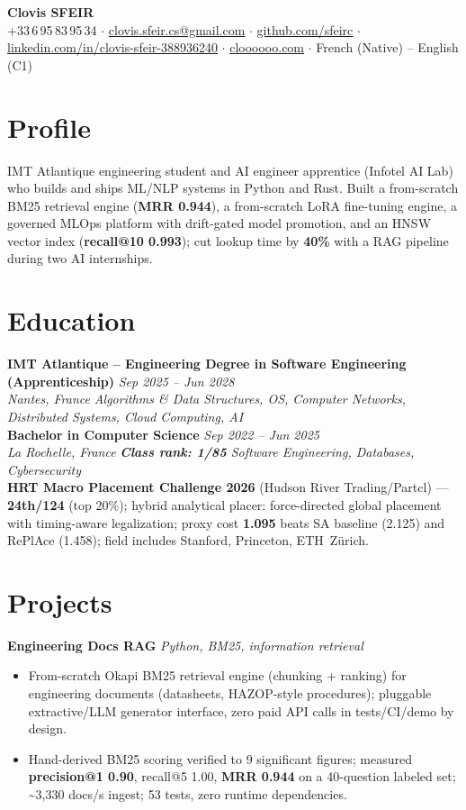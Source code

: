 \documentclass[10pt]{article}
\newcommand{\entry}[4]{%
  \noindent\textbf{#1} \hfill \textit{#2} \\
  \textit{#3} \hfill \textit{#4}\\[-0.22em]
}
\newcommand{\projectentry}[2]{%
  \noindent\textbf{#1} \hfill \textit{#2}\\[-0.3em]
}
\begin{document}
\fontsize{9.3pt}{11pt}\selectfont
\begin{center}
  {\LARGE \textbf{Clovis SFEIR}}\\[0.3em]
  +33\,6\,95\,83\,95\,34 \;$\cdot$\; \href{mailto:clovis.sfeir.cs@gmail.com}{clovis.sfeir.cs@gmail.com} \;$\cdot$\;
  \href{https://github.com/sfeirc}{github.com/sfeirc} \;$\cdot$\;
  \href{https://linkedin.com/in/clovis-sfeir-388936240}{linkedin.com/in/clovis-sfeir-388936240} \;$\cdot$\;
  \href{https://cloooooo.com}{cloooooo.com} \;$\cdot$\; French (Native) -- English (C1)
\end{center}

\section*{Profile}
IMT Atlantique engineering student and AI engineer apprentice (Infotel AI Lab) who builds and ships ML/NLP systems in Python and Rust. Built a from-scratch BM25 retrieval engine (\textbf{MRR 0.944}), a from-scratch LoRA fine-tuning engine, a governed MLOps platform with drift-gated model promotion, and an HNSW vector index (\textbf{recall@10 0.993}); cut lookup time by \textbf{40\%} with a RAG pipeline during two AI internships.

\section*{Education}
\entry{IMT Atlantique -- Engineering Degree in Software Engineering (Apprenticeship)}{Sep 2025 -- Jun 2028}{Nantes, France}{Algorithms \& Data Structures, OS, Computer Networks, Distributed Systems, Cloud Computing, AI}
\entry{Bachelor in Computer Science}{Sep 2022 -- Jun 2025}{La Rochelle, France}{\textbf{Class rank: 1/85} \textbar{} Software Engineering, Databases, Cybersecurity}
\noindent\textbf{HRT Macro Placement Challenge 2026} (Hudson River Trading/Partcl) --- \textbf{24th/124} (top 20\%); hybrid analytical placer: force-directed global placement with timing-aware legalization; proxy cost \textbf{1.095} beats SA baseline (2.125) and RePlAce (1.458); field includes Stanford, Princeton, ETH~Z\"urich.

\section*{Projects}

\projectentry{Engineering Docs RAG}{Python, BM25, information retrieval}
\begin{itemize}
  \item From-scratch Okapi BM25 retrieval engine (chunking + ranking) for engineering documents (datasheets, HAZOP-style procedures); pluggable extractive/LLM generator interface, zero paid API calls in tests/CI/demo by design.
  \item Hand-derived BM25 scoring verified to 9 significant figures; measured \textbf{precision@1 0.90}, recall@5 1.00, \textbf{MRR 0.944} on a 40-question labeled set; \textasciitilde3{,}330 docs/s ingest; 53 tests, zero runtime dependencies.
\end{itemize}
\end{document}
